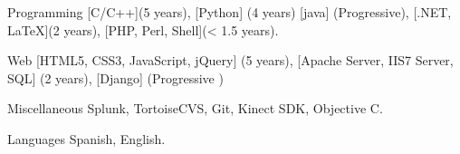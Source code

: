 


\begin{cvskills}


\cvskill
{Programming} %
{ [C/C++](5 years), [Python] (4 years) [java] (Progressive), [.NET, LaTeX](2 years), [PHP, Perl, Shell](< 1.5 years).}


\cvskill
{Web} %
{ [HTML5, CSS3, JavaScript, jQuery] (5 years), [Apache Server, IIS7 Server, SQL] (2 years), [Django] (Progressive ) }



\cvskill
{Miscellaneous} %
{Splunk, TortoiseCVS, Git, Kinect SDK, Objective C.}


\cvskill
{Languages} %
{Spanish, English.} %


\end{cvskills}
